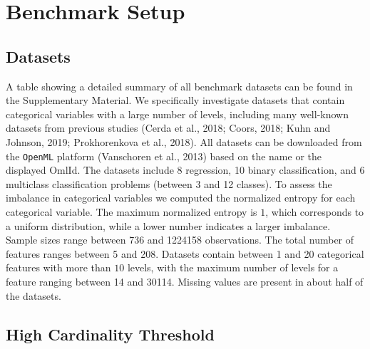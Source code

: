 \documentclass[smallextended]{svjour3}       %
\begin{document}
\hypertarget{benchmark-setup}{%
\section{Benchmark Setup}\label{benchmark-setup}}

\hypertarget{datasets}{%
\subsection{Datasets}\label{datasets}}

A table showing a detailed summary of all benchmark datasets can be found in the Supplementary Material.
We specifically investigate datasets that contain categorical variables with a large number of levels, including many well-known datasets
from previous studies (Cerda et al., 2018; Coors, 2018; Kuhn and Johnson, 2019; Prokhorenkova et al., 2018).
All datasets can be downloaded from the \texttt{OpenML} platform (Vanschoren et al., 2013) based on the name or the displayed OmlId.
The datasets include 8 regression, 10 binary classification, and 6 multiclass classification problems (between 3 and 12 classes).
To assess the imbalance in categorical variables we computed the normalized entropy for each categorical variable.
The maximum normalized entropy is \(1\), which corresponds to a uniform distribution, while a lower number indicates a larger imbalance.
Sample sizes range between 736 and 1224158 observations.
The total number of features ranges between 5 and 208.
Datasets contain between 1 and 20 categorical features with more than \(10\) levels, with the maximum number of levels for a feature ranging between 14 and 30114. Missing values are present in about half of the datasets.

\hypertarget{high-cardinality-threshold}{%
\subsection{High Cardinality Threshold}\label{high-cardinality-threshold}}

\label{sec:HCT}
\end{document}
